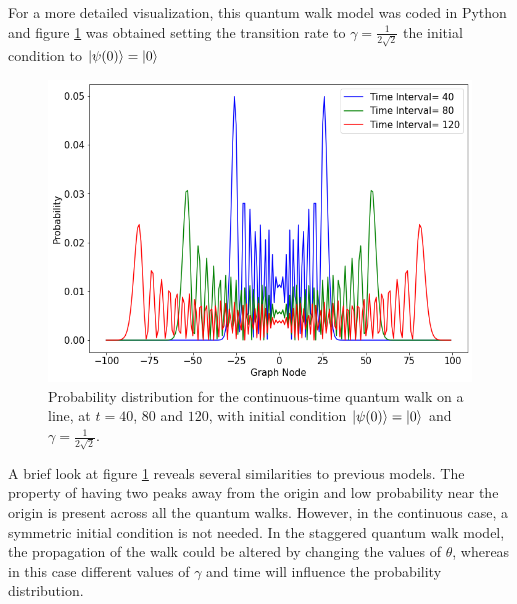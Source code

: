 \documentclass[../../dissertation.tex]{subfiles}
\begin{document}
For a more detailed visualization, this quantum walk model was coded in Python
and figure \ref{fig:contdist0} was obtained setting the transition rate to
$\gamma=\frac{1}{2\sqrt{2}}$ the initial condition to $\ket{\psi(0)} = \ket{0}$ 
\begin{figure}[!h]
	\centering
	\includegraphics[scale=0.40]{img/ContQuantumWalk/ctqwMultipleTime.png}
	\caption{Probability distribution for the continuous-time quantum walk on a line, at $t=40$, $80$ and $120$, with initial condition $\ket{\psi(0)}=\ket{0}$ and $\gamma=\frac{1}{2\sqrt{2}}$.} 
	\label{fig:contdist0}
\end{figure}
A brief look at figure \ref{fig:contdist0} reveals several similarities to
previous models. The property of having two peaks away from the origin and low
probability near the origin is present across all the quantum walks. However, in
the continuous case, a symmetric initial condition is not needed. In the
staggered quantum walk model, the propagation of the walk could be altered by
changing the values of $\theta$, whereas in this case different values of
$\gamma$ and time will influence the probability distribution.\par
\end{document}
